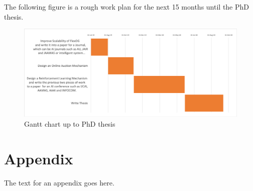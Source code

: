 \documentclass[11pt]{phdthesis}
\newcommand{\source}[1]{\caption*{Source: {#1}} }
\begin{document}
\begin{enumerate}
	
\end{enumerate}

The following figure is a rough work plan for the next 15 months until the PhD thesis.

\begin{figure}
	\center
	\includegraphics[width = 1\textwidth]{./Figures/GanttChart.png}
	\caption{Gantt chart up to PhD thesis}
	\label{fig:Gantt chart}
\end{figure}


\appendix
\chapter{Appendix}
The text for an appendix goes here.

\backmatter


\end{document}
